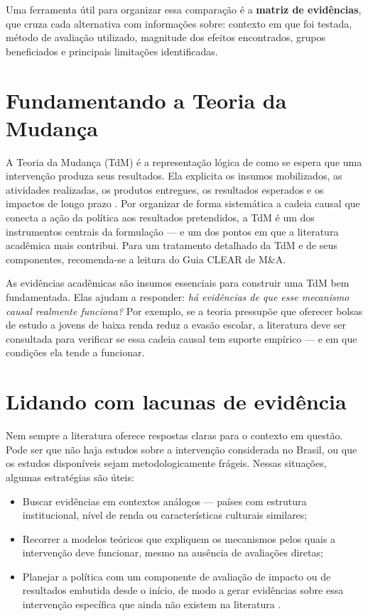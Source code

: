 \documentclass[12pt, a4paper, openany]{book}
\begin{document}
Uma ferramenta útil para organizar essa comparação é a \textbf{matriz de
evidências}, que cruza cada alternativa com informações sobre: contexto em
que foi testada, método de avaliação utilizado, magnitude dos efeitos
encontrados, grupos beneficiados e principais limitações identificadas.

\section{Fundamentando a Teoria da Mudança}

A Teoria da Mudança (TdM) é a representação lógica de como se espera que uma
intervenção produza seus resultados. Ela explicita os insumos mobilizados, as
atividades realizadas, os produtos entregues, os resultados esperados e os
impactos de longo prazo \citep{Lima2025}. Por organizar de forma sistemática a
cadeia causal que conecta a ação da política aos resultados pretendidos, a
TdM é um dos instrumentos centrais da formulação --- e um dos pontos em que a
literatura acadêmica mais contribui. Para um tratamento detalhado da TdM e de
seus componentes, recomenda-se a leitura do Guia CLEAR de M\&A.

As evidências acadêmicas são insumos essenciais para construir uma TdM bem
fundamentada. Elas ajudam a responder: \textit{há evidências de que esse
mecanismo causal realmente funciona?} Por exemplo, se a teoria pressupõe que
oferecer bolsas de estudo a jovens de baixa renda reduz a evasão escolar, a
literatura deve ser consultada para verificar se essa cadeia causal tem
suporte empírico --- e em que condições ela tende a funcionar.

\section{Lidando com lacunas de evidência}

Nem sempre a literatura oferece respostas claras para o contexto em questão.
Pode ser que não haja estudos sobre a intervenção considerada no Brasil, ou
que os estudos disponíveis sejam metodologicamente frágeis. Nessas situações,
algumas estratégias são úteis:

\begin{itemize}[leftmargin=*]
  \item Buscar evidências em contextos análogos --- países com estrutura
    institucional, nível de renda ou características culturais similares;
  \item Recorrer a modelos teóricos que expliquem os mecanismos pelos quais a
    intervenção deve funcionar, mesmo na ausência de avaliações diretas;
  \item Planejar a política com um componente de avaliação de impacto ou de
    resultados embutida desde o início, de modo a gerar evidências sobre
    essa intervenção específica que ainda não existem na literatura
    \citep{Imas2009}.
\end{itemize}
\end{document}
